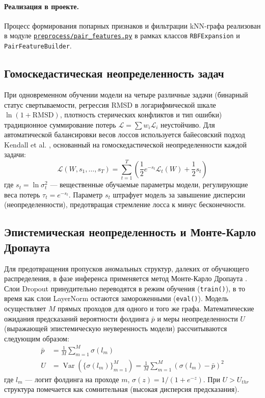 \documentclass[12pt, a4paper]{article}
\begin{document}
\paragraph{Реализация в проекте.}
Процесс формирования попарных признаков и фильтрации kNN-графа реализован в модуле \href{file:///home/pc/PycharmProjects/BbValidator/preprocess/pair_features.py}{\texttt{preprocess/pair\_features.py}} в рамках классов \texttt{RBFExpansion} и \texttt{PairFeatureBuilder}.

\subsection{Гомоскедастическая неопределенность задач}
При одновременном обучении модели на четыре различные задачи (бинарный статус свертываемости, регрессия RMSD в логарифмической шкале $\ln(1+\text{RMSD})$, плотность стерических конфликтов и тип ошибки) традиционное суммирование потерь $\mathcal{L} = \sum w_i \mathcal{L}_i$ неустойчиво. Для автоматической балансировки весов лоссов используется байесовский подход Kendall et al. \cite{kendall2018}, основанный на гомоскедастической неопределенности каждой задачи:
\begin{equation}
    \mathcal{L}(W, s_1, \dots, s_T) = \sum_{t=1}^T \left( \frac{1}{2} e^{-s_t} \mathcal{L}_t(W) + \frac{1}{2} s_t \right)
\end{equation}
где $s_t = \ln \sigma_t^2$ — вещественные обучаемые параметры модели, регулирующие веса потерь $\tau_t = e^{-s_t}$. Параметр $s_t$ штрафует модель за завышение дисперсии (неопределенности), предотвращая стремление лосса к минус бесконечности.

\subsection{Эпистемическая неопределенность и Монте-Карло Дропаута}
Для предотвращения пропусков аномальных структур, далеких от обучающего распределения, в фазе инференса применяется метод Монте-Карло Дропаута \cite{gal2016}. Слои Dropout принудительно переводятся в режим обучения (\texttt{train()}), в то время как слои LayerNorm остаются замороженными (\texttt{eval()}).
Модель осуществляет $M$ прямых проходов для одного и того же графа. Математические ожидания предсказаний вероятности фолдинга $\bar{p}$ и меры неопределенности $U$ (выражающей эпистемическую неуверенность модели) рассчитываются следующим образом:
\begin{align}
    \bar{p} &= \frac{1}{M} \sum_{m=1}^M \sigma(l_m) \\
    U &= \operatorname{Var}\left(\{ \sigma(l_m) \}_{m=1}^M \right) = \frac{1}{M} \sum_{m=1}^M \left( \sigma(l_m) - \bar{p} \right)^2
\end{align}
где $l_m$ — логит фолдинга на проходе $m$, $\sigma(z) = 1/(1+e^{-z})$. При $U > U_{thr}$ структура помечается как сомнительная (высокая дисперсия предсказания).
\end{document}
